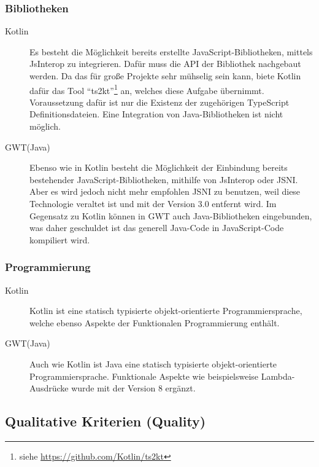 \subsubsection{Bibliotheken}
\begin{description}
	\item[Kotlin] Es besteht die Möglichkeit bereits erstellte JavaScript-Bibliotheken, mittels \gls{JsInterop} zu integrieren. Dafür muss die \gls{API} der Bibliothek nachgebaut werden. Da das für große Projekte sehr mühselig sein kann, biete Kotlin dafür das Tool \enquote{ts2kt}\footnote{siehe \url{https://github.com/Kotlin/ts2kt}} an, welches diese Aufgabe übernimmt. Voraussetzung dafür ist nur die Existenz der zugehörigen TypeScript Definitionsdateien. Eine Integration von Java-Bibliotheken ist nicht möglich. \cite{kotlinJsInteop, kotlinJsJavaToJs}
	\item[GWT(Java)] Ebenso wie in Kotlin besteht die Möglichkeit der Einbindung bereits bestehender JavaScript-Bibliotheken, mithilfe von \gls{JsInterop} oder \gls{JSNI}. Aber es wird jedoch nicht mehr empfohlen  \gls{JSNI} zu benutzen, weil diese Technologie veraltet ist und mit der Version 3.0 entfernt wird. Im Gegensatz zu Kotlin können in \gls{GWT} auch Java-Bibliotheken eingebunden, was daher geschuldet ist das generell Java-Code in JavaScript-Code kompiliert wird. \cite{gwtJsInterop, gwtJSNI}
\end{description}

\subsubsection{Programmierung}
\begin{description}
	\item[Kotlin] Kotlin ist eine statisch typisierte objekt-orientierte Programmiersprache, welche ebenso Aspekte der Funktionalen Programmierung enthält. \cite{kotlinInfo}
	\item[GWT(Java)] Auch wie Kotlin ist Java eine statisch typisierte objekt-orientierte Programmiersprache. Funktionale Aspekte wie beispielsweise Lambda-Ausdrücke wurde mit der Version 8 ergänzt. \cite{java8Specification}
\end{description}

\subsection{Qualitative Kriterien (Quality)}
